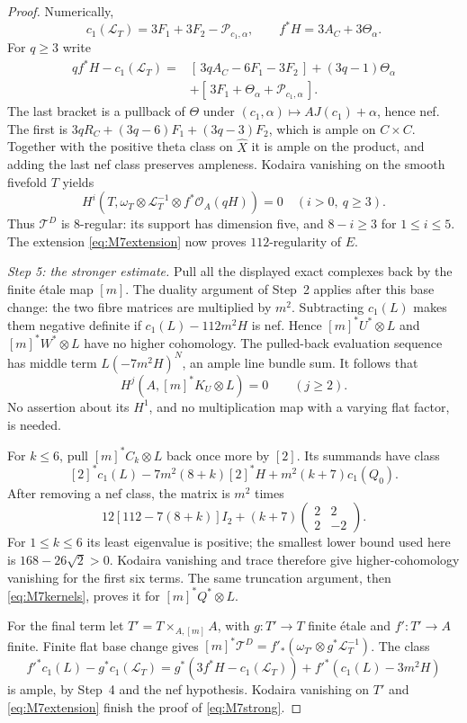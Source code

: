 \documentclass[11pt,a4paper]{article}
\theoremstyle{definition}\newtheorem{definition}[theorem]{Definition}
\theoremstyle{remark}\newtheorem{remark}[theorem]{Remark}
\newcommand{\cO}{\mathcal O}\newcommand{\CH}{\operatorname{CH}}\newcommand{\cl}{\operatorname{cl}}
\begin{document}
\begin{proof}
Numerically,
\[
 c_1(\mathcal L_T)=3F_1+3F_2-\mathcal P_{c_1,\alpha},
 \qquad f^*H=3A_C+3\Theta_\alpha.
\]
For $q\ge3$ write
\begin{align*}
 qf^*H-c_1(\mathcal L_T)
  ={}&[\,3qA_C-6F_1-3F_2\,]+(3q-1)\Theta_\alpha\\
    &+[\,3F_1+\Theta_\alpha+\mathcal P_{c_1,\alpha}\,].
\end{align*}
The last bracket is a pullback of $\Theta$ under
$(c_1,\alpha)\mapsto AJ(c_1)+\alpha$, hence nef.
The first is
$3qR_C+(3q-6)F_1+(3q-3)F_2$, which is ample on $C\times C$.
Together with the positive theta class on $\widehat X$ it is ample
on the product, and adding the last nef class preserves ampleness.
Kodaira vanishing on the smooth fivefold $T$ yields
\[
 H^i(T,\omega_T\otimes\mathcal L_T^{-1}\otimes f^*\cO_A(qH))=0
 \quad(i>0,\ q\ge3).
\]
Thus $\mathcal T^D$ is $8$-regular: its support has dimension five,
and $8-i\ge3$ for $1\le i\le5$.
The extension \eqref{eq:M7extension} now proves
$112$-regularity of $E$.

\emph{Step 5: the stronger estimate.}
Pull all the displayed exact complexes back by the finite \'etale
map $[m]$. The duality argument of Step~2 applies after this base
change: the two fibre matrices are multiplied by $m^2$.
Subtracting $c_1(L)$ makes them negative definite if
$c_1(L)-112m^2H$ is nef. Hence $[m]^*U^*\otimes L$ and
$[m]^*W^*\otimes L$ have no higher cohomology.
The pulled-back evaluation sequence has middle term
$L(-7m^2H)^N$, an ample line bundle sum. It follows that
\[
 H^j(A,[m]^*K_U\otimes L)=0\qquad(j\ge2).
\]
No assertion about its $H^1$, and no multiplication map with a
varying flat factor, is needed.

For $k\le6$, pull $[m]^*C_k\otimes L$ back once more by $[2]$.
Its summands have class
\[
 [2]^*c_1(L)-7m^2(8+k)[2]^*H+m^2(k+7)c_1(Q_0).
\]
After removing a nef class, the matrix is $m^2$ times
\[
 12[112-7(8+k)]I_2+
       (k+7)\begin{pmatrix}2&2\\2&-2\end{pmatrix}.
\]
For $1\le k\le6$ its least eigenvalue is positive; the smallest
lower bound used here is $168-26\sqrt2>0$.
Kodaira vanishing and trace therefore give higher-cohomology
vanishing for the first six terms. The same truncation argument,
then \eqref{eq:M7kernels}, proves it for $[m]^*Q^*\otimes L$.

For the final term let $T'=T\times_{A,[m]}A$, with
$g:T'\to T$ finite \'etale and $f':T'\to A$ finite.
Finite flat base change gives
$[m]^*\mathcal T^D=f'_*(\omega_{T'}\otimes g^*\mathcal L_T^{-1})$.
The class
\[
 f'^*c_1(L)-g^*c_1(\mathcal L_T)
 =g^*(3f^*H-c_1(\mathcal L_T))
       +f'^*(c_1(L)-3m^2H)
\]
is ample, by Step~4 and the nef hypothesis.
Kodaira vanishing on $T'$ and
\eqref{eq:M7extension} finish the proof of \eqref{eq:M7strong}.
\end{proof}
\end{document}
